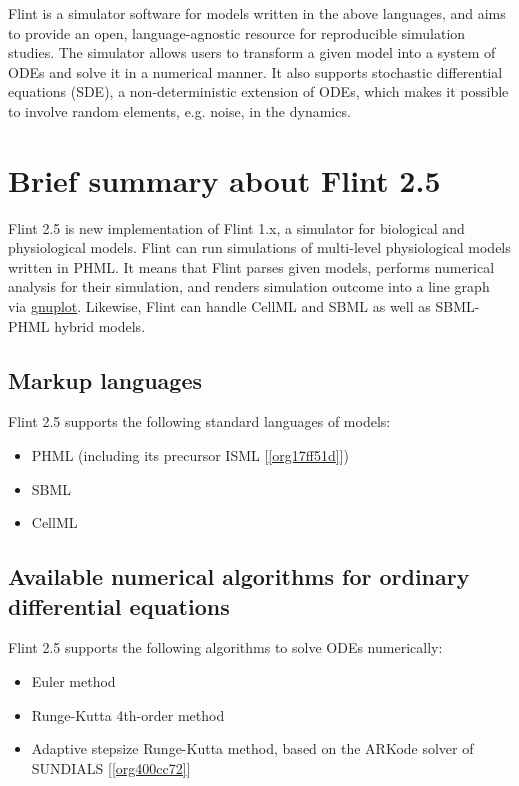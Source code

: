 \documentclass[a4paper,10pt]{report}
\begin{document}
Flint is a simulator software for models written in the above languages, and
aims to provide an open, language-agnostic resource for reproducible simulation
studies. The simulator allows users to transform a given model into a system of
ODEs and solve it in a numerical manner. It also supports stochastic
differential equations (SDE), a non-deterministic extension of ODEs, which makes
it possible to involve random elements, e.g. noise, in the dynamics.

\section{Brief summary about Flint 2.5}
\label{sec:orgd03954f}
Flint 2.5 is new implementation of Flint 1.x, a simulator for biological and physiological models.
Flint can run simulations of multi-level physiological models written in PHML.
It means that Flint parses given models, performs numerical analysis for their
simulation, and renders simulation outcome into a line graph via \href{http://www.gnuplot.info/}{gnuplot}.
Likewise, Flint can handle CellML and SBML as well as SBML-PHML hybrid models.

\subsection{Markup languages}
\label{sec:org710b2ad}
Flint 2.5 supports the following standard languages of models:

\begin{itemize}
\item PHML (including its precursor ISML [\ref{org17ff51d}])
\item SBML
\item CellML
\end{itemize}

\subsection{Available numerical algorithms for ordinary differential equations}
\label{sec:org0d15f60}
Flint 2.5 supports the following algorithms to solve ODEs numerically:

\begin{itemize}
\item Euler method
\item Runge-Kutta 4th-order method
\item Adaptive stepsize Runge-Kutta method, based on the ARKode solver of
SUNDIALS [\ref{org400cc72}]
\end{itemize}
\end{document}
